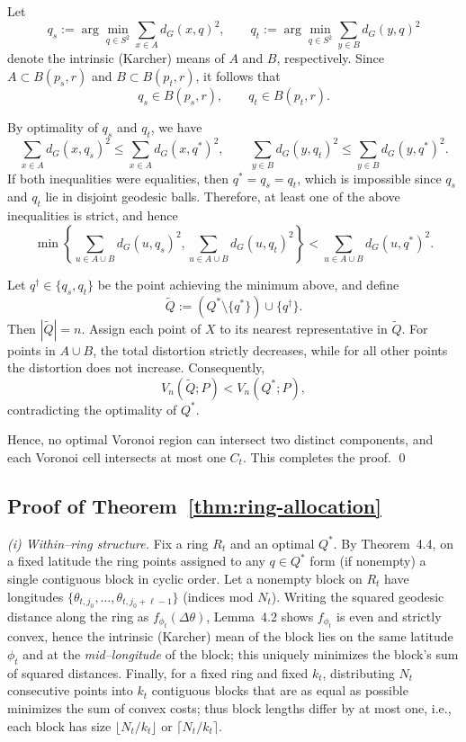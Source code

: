 \documentclass[12pt, reqno]{amsart}
\theoremstyle{plain}
\theoremstyle{definition}
\begin{document}
Let
\[
q_s := \arg\min_{q\in S^2}\sum_{x\in A} d_G(x,q)^2,
\qquad
q_t := \arg\min_{q\in S^2}\sum_{y\in B} d_G(y,q)^2
\]
denote the intrinsic (Karcher) means of $A$ and $B$, respectively.
Since $A\subset B(p_s,r)$ and $B\subset B(p_t,r)$, it follows that
\[
q_s \in B(p_s,r), \qquad q_t \in B(p_t,r).
\]

By optimality of $q_s$ and $q_t$, we have
\[
\sum_{x\in A} d_G(x,q_s)^2 \le \sum_{x\in A} d_G(x,q^*)^2,
\qquad
\sum_{y\in B} d_G(y,q_t)^2 \le \sum_{y\in B} d_G(y,q^*)^2.
\]
If both inequalities were equalities, then $q^*=q_s=q_t$, which is impossible
since $q_s$ and $q_t$ lie in disjoint geodesic balls.
Therefore, at least one of the above inequalities is strict, and hence
\[
\min\!\left\{
\sum_{u\in A\cup B} d_G(u,q_s)^2,
\sum_{u\in A\cup B} d_G(u,q_t)^2
\right\}
<
\sum_{u\in A\cup B} d_G(u,q^*)^2.
\]

Let $q^\dagger\in\{q_s,q_t\}$ be the point achieving the minimum above, and define
\[
\widetilde Q := (Q^*\setminus\{q^*\})\cup\{q^\dagger\}.
\]
Then $|\widetilde Q|=n$.
Assign each point of $X$ to its nearest representative in $\widetilde Q$.
For points in $A\cup B$, the total distortion strictly decreases, while for all
other points the distortion does not increase.
Consequently,
\[
V_n(\widetilde Q;P) < V_n(Q^*;P),
\]
contradicting the optimality of $Q^*$.

Hence, no optimal Voronoi region can intersect two distinct components, and each
Voronoi cell intersects at most one $C_t$.
This completes the proof.
 \qed 

 
\subsection*{Proof of Theorem~\ref{thm:ring-allocation}}  
\emph{(i) Within–ring structure.}
Fix a ring $R_t$ and an optimal $Q^*$. By Theorem~4.4, on a fixed latitude the ring points assigned to any $q\in Q^*$ form (if nonempty) a single contiguous block in cyclic order. 
Let a nonempty block on $R_t$ have longitudes $\{\theta_{t,j_0},\dots,\theta_{t,j_0+\ell-1}\}$ (indices mod $N_t$). 
Writing the squared geodesic distance along the ring as $f_{\phi_t}(\Delta\theta)$, Lemma~4.2 shows $f_{\phi_t}$ is even and strictly convex, hence the intrinsic (Karcher) mean of the block lies on the same latitude $\phi_t$ and at the \emph{mid–longitude} of the block; this uniquely minimizes the block’s sum of squared distances. 
Finally, for a fixed ring and fixed $k_t$, distributing $N_t$ consecutive points into $k_t$ contiguous blocks that are as equal as possible minimizes the sum of convex costs; thus block lengths differ by at most one, i.e., each block has size $\lfloor N_t/k_t\rfloor$ or $\lceil N_t/k_t\rceil$.
\end{document}

